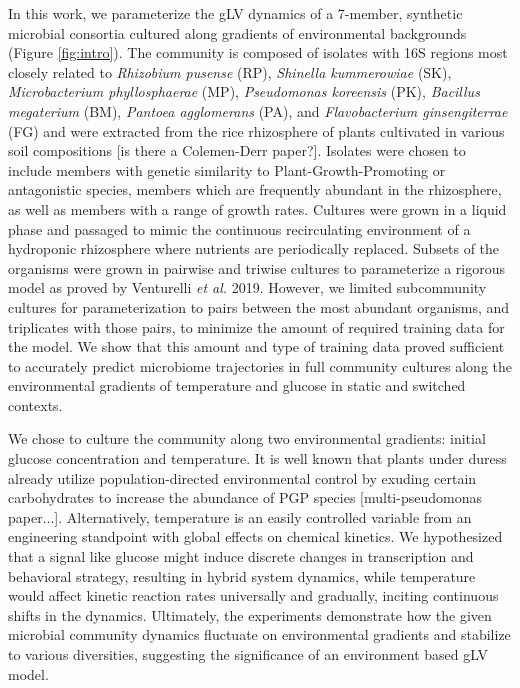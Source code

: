 \documentclass[twocolumn, 10pt]{report}
\begin{document}
{In this work, we parameterize the gLV dynamics of a 7-member, synthetic microbial consortia cultured along gradients of environmental backgrounds (Figure \ref{fig:intro}). The community is composed of isolates with 16S regions most closely related to \textit{Rhizobium pusense} (RP), \textit{Shinella kummerowiae} (SK), \textit{Microbacterium phyllosphaerae} (MP), \textit{Pseudomonas koreensis} (PK), \textit{Bacillus megaterium} (BM), \textit{Pantoea agglomerans} (PA), and \textit{Flavobacterium ginsengiterrae} (FG) and were extracted from the rice rhizosphere of plants cultivated in various soil compositions [is there a Colemen-Derr paper?]. Isolates were chosen to include members with genetic similarity to Plant-Growth-Promoting or antagonistic species, members which are frequently abundant in the rhizosphere, as well as members with a range of growth rates. Cultures were grown in a liquid phase and passaged to mimic the continuous recirculating environment of a hydroponic rhizosphere where nutrients are periodically replaced. Subsets of the organisms were grown in pairwise and triwise cultures to parameterize a rigorous model as proved by Venturelli \emph{et al.} 2019. However, we limited subcommunity cultures for parameterization to pairs between the most abundant organisms, and triplicates with those pairs, to minimize the amount of required training data for the model. We show that this amount and type of training data proved sufficient to accurately predict microbiome trajectories in full community cultures along the environmental gradients of temperature and glucose in static and switched contexts. 

We chose to culture the community along two environmental gradients: initial glucose concentration and temperature. It is well known that plants under duress already utilize population-directed environmental control by exuding certain carbohydrates to increase the abundance of PGP species [multi-pseudomonas paper...]. Alternatively, temperature is an easily controlled variable from an engineering standpoint with global effects on chemical kinetics. We hypothesized that a signal like glucose might induce discrete changes in transcription and behavioral strategy, resulting in hybrid system dynamics, while temperature would affect kinetic reaction rates universally and gradually, inciting continuous shifts in the dynamics. Ultimately, the experiments demonstrate how the given microbial community dynamics fluctuate on environmental gradients and stabilize to various diversities, suggesting the significance of an environment based gLV model. 

}
\end{document}

